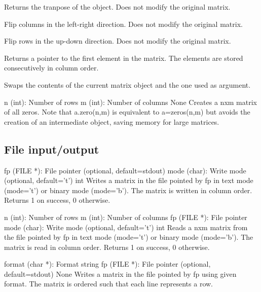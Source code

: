 {Returns the tranpose of the object. Does not modify the original matrix.}

{Flip columns in the left-right direction. Does not modify the original matrix.}

{Flip rows in the up-down direction. Does not modify the original matrix.}

{Returns a pointer to the first element in the matrix. The elements are stored consecutively in column order.}

{Swaps the contents of the current matrix object and the one used as argument.}

{n (int): Number of rows\newline
m (int): Number of columns}
{None}
{Creates a nxm matrix of all zeros. Note that a.zero(n,m) is equivalent to a=zeros(n,m) but avoids
the creation of an intermediate object, saving memory for large matrices.}

\subsection{File input/output}

{fp (FILE *): File pointer (optional, default=stdout)\newline
mode (char): Write mode (optional, default='t')}
{int}
{Writes a matrix in the file pointed by fp in text mode (mode='t') or binary mode (mode='b').
The matrix is written in column order. Returns 1 on success, 0 otherwise.}

{n (int): Number of rows\newline
m (int): Number of columns\newline
fp (FILE *): File pointer\newline
mode (char): Write mode (optional, default='t')}
{int}
{Reads a nxm matrix from the file pointed by fp in text mode (mode='t') or binary mode (mode='b').
The matrix is read in column order. Returns 1 on success, 0 otherwise.}

{format (char *): Format string\newline
fp (FILE *): File pointer (optional, default=stdout)}
{None}
{Writes a matrix in the file pointed by fp using given format. The matrix is ordered such that
each line represents a row.}

